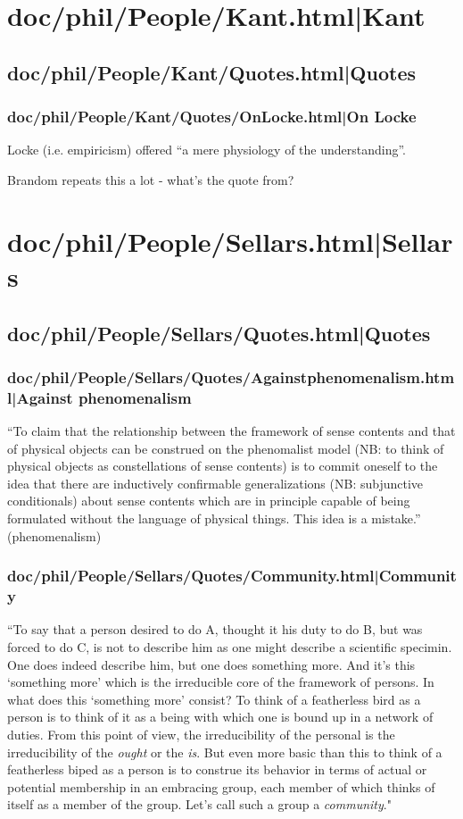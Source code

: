 \documentclass[12pt,a4paper]{report}
\begin{document}
\chapter{doc/phil/People/Kant.html|Kant}

\section{doc/phil/People/Kant/Quotes.html|Quotes}

\subsection{doc/phil/People/Kant/Quotes/OnLocke.html|On Locke}
Locke (i.e. empiricism) offered ``a mere physiology of the understanding''.

Brandom repeats this a lot - what's the quote from?
\chapter{doc/phil/People/Sellars.html|Sellars}

\section{doc/phil/People/Sellars/Quotes.html|Quotes}

\subsection{doc/phil/People/Sellars/Quotes/Againstphenomenalism.html|Against phenomenalism}
``To claim that the relationship between the framework of sense contents and
that of physical objects can be construed on the phenomalist model (NB: to
think of physical objects as constellations of sense contents) is to commit
oneself to the idea that there are inductively confirmable generalizations (NB:
 subjunctive conditionals) about sense contents which are in principle capable
 of being formulated without the language of physical things. This idea is a
 mistake.'' (phenomenalism)

\subsection{doc/phil/People/Sellars/Quotes/Community.html|Community}
``To say that a person desired to do A, thought it his duty to do B, but was forced to do C, is not to describe him as one might describe a scientific specimin. One does indeed describe him, but one does something more. And it's this `something more' which is the irreducible core of the framework of persons. In what does this `something more' consist? To think of a featherless bird as a person is to think of it as a being with which  one is bound up in a network of duties. From this point of view, the irreducibility of the personal is the irreducibility of the \emph{ought} or the \emph{is}. But even more basic than this to think of a featherless biped as a person is to construe its behavior in terms of actual or potential membership in an embracing group, each member of which thinks of itself as a member of the group. Let's call such a group a \emph{community}."
\end{document}
